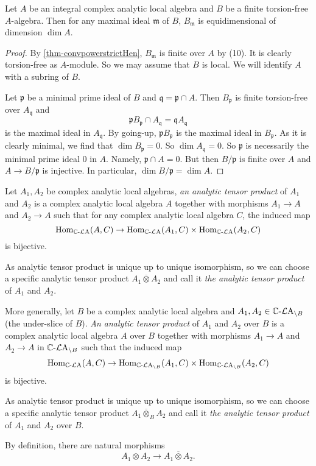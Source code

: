 \begin{lemma}\label{lma-finitetorsionfreeoverlocalequidim}
    Let $A$ be an integral complex analytic local algebra and $B$ be a finite torsion-free $A$-algebra. Then for any maximal ideal $\mathfrak{m}$ of $B$,
    $B_{\mathfrak{m}}$ is equidimensional of dimension $\dim A$.
\end{lemma}
\begin{proof}
    By \cref{thm-convpowerstrictHen}, $B_{\mathfrak{m}}$ is finite over $A$ by \cite[\href{https://stacks.math.columbia.edu/tag/04GG}{Tag 04GG}]{stacks-project}(10). It is clearly torsion-free as $A$-module. So we may assume that $B$ is local. We will identify $A$ with a subring of $B$.

    Let $\mathfrak{p}$ be a minimal prime ideal of $B$ and $\mathfrak{q}=\mathfrak{p}\cap A$. Then $B_{\mathfrak{p}}$ is finite torsion-free over $A_{\mathfrak{q}}$ and 
    \[
        \mathfrak{p}B_{\mathfrak{p}}\cap A_{\mathfrak{q}}=\mathfrak{q}A_{\mathfrak{q}}    
    \]
    is the maximal ideal in $A_{\mathfrak{q}}$. By going-up, $\mathfrak{p}B_{\mathfrak{p}}$ is the maximal ideal in $B_{\mathfrak{p}}$. As it is clearly minimal, we find that $\dim B_{\mathfrak{p}}=0$. So $\dim A_{\mathfrak{q}}=0$. So $\mathfrak{p}$ is necessarily the minimal prime ideal $0$ in $A$. Namely, $\mathfrak{p}\cap A=0$. But then $B/\mathfrak{p}$ is finite over $A$ and $A\rightarrow B/\mathfrak{p}$ is injective. In particular, $\dim B/\mathfrak{p}=\dim A$.
\end{proof}

\begin{definition}\label{def-analytictensor}
    Let $A_1,A_2$ be complex analytic local algebras, \emph{an analytic tensor product} of $A_1$ and $A_2$ is a complex analytic local algebra $A$ together with morphisms $A_1\rightarrow A$ and $A_2\rightarrow A$ such that for any complex analytic local algebra $C$, the induced map
    \[
      \operatorname{Hom}_{\mathbb{C}\text{-}\mathcal{L}\mathrm{A}}(A,C)\rightarrow  \operatorname{Hom}_{\mathbb{C}\text{-}\mathcal{L}\mathrm{A}}(A_1,C)\times  \operatorname{Hom}_{\mathbb{C}\text{-}\mathcal{L}\mathrm{A}}(A_2,C)
    \]
    is bijective.

    As analytic tensor product is unique up to unique isomorphism, so we can choose a specific analytic tensor product $A_1\overline{\otimes} A_2$ and call it \emph{the analytic tensor product} of $A_1$ and $A_2$.

    More generally, let $B$ be a complex analytic local algebra and $A_1,A_2\in \mathbb{C}\text{-}\mathcal{L}\mathrm{A}_{\backslash B}$ (the under-slice of $B$).
    \emph{An analytic tensor product} of $A_1$ and $A_2$ over $B$ is a complex analytic local algebra $A$ over $B$ together with morphisms $A_1\rightarrow A$ and $A_2\rightarrow A$ in $\mathbb{C}\text{-}\mathcal{L}\mathrm{A}_{\backslash B}$ such that the induced map
    \[
      \operatorname{Hom}_{\mathbb{C}\text{-}\mathcal{L}\mathrm{A}}(A,C)\rightarrow  \operatorname{Hom}_{\mathbb{C}\text{-}\mathcal{L}\mathrm{A}_{\backslash B}}(A_1,C)\times \operatorname{Hom}_{\mathbb{C}\text{-}\mathcal{L}\mathrm{A}_{\backslash B}}(A_2,C)
    \]
    is bijective.
    
    As analytic tensor product is unique up to unique isomorphism, so we can choose a specific analytic tensor product $A_1\overline{\otimes}_B A_2$ and call it \emph{the analytic tensor product} of $A_1$ and $A_2$ over $B$.
\end{definition}
By definition, there are natural morphisms 
\[
    A_1\otimes A_2\rightarrow A_1\overline{\otimes} A_2.
\]

